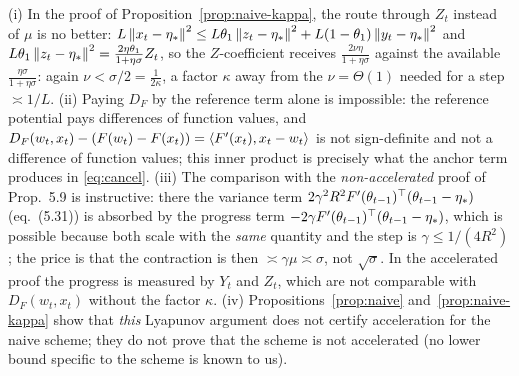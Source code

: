 \begin{remark}\label{rem:naive-honest}
(i) In the proof of Proposition~\ref{prop:naive-kappa}, the route through $Z_t$ instead of $\mu$ is no better: $L\left\|x_t-\eta_\ast\right\|^2\le L\theta_1\left\|z_t-\eta_\ast\right\|^2+L(1-\theta_1)\left\|y_t-\eta_\ast\right\|^2$ and $L\theta_1\left\|z_t-\eta_\ast\right\|^2=\frac{2\eta\theta_1}{1+\eta\sigma}Z_t$, so the $Z$-coefficient receives $\frac{2\nu\eta}{1+\eta\sigma}$ against the available $\frac{\eta\sigma}{1+\eta\sigma}$: again $\nu<\sigma/2=\frac1{2\kappa}$, a factor $\kappa$ away from the $\nu=\Theta(1)$ needed for a step $\asymp1/L$. (ii) Paying $D_F$ by the reference term alone is impossible: the reference potential pays differences of function values, and $D_F(w_t,x_t)-(F(w_t)-F(x_t))=\left\langle F'(x_t), x_t-w_t \right\rangle$ is not sign-definite and not a difference of function values; this inner product is precisely what the anchor term produces in \eqref{eq:cancel}. (iii) The comparison with the \emph{non-accelerated} proof of Prop.~5.9 is instructive: there the variance term $2\gamma^2R^2F'(\theta_{t-1})^\top(\theta_{t-1}-\eta_\ast)$ (eq.~(5.31)) is absorbed by the progress term $-2\gamma F'(\theta_{t-1})^\top(\theta_{t-1}-\eta_\ast)$, which is possible because both scale with the \emph{same} quantity and the step is $\gamma\le1/(4R^2)$; the price is that the contraction is then $\asymp\gamma\mu\asymp\sigma$, not $\sqrt\sigma$. In the accelerated proof the progress is measured by $Y_t$ and $Z_t$, which are not comparable with $D_F(w_t,x_t)$ without the factor $\kappa$. (iv) Propositions~\ref{prop:naive} and~\ref{prop:naive-kappa} show that \emph{this} Lyapunov argument does not certify acceleration for the naive scheme; they do not prove that the scheme is not accelerated (no lower bound specific to the scheme is known to us).
\end{remark}

